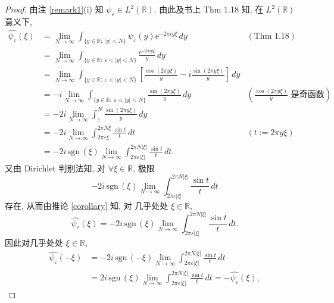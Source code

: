 \documentclass[a4paper,11pt]{article}
\theoremstyle{definition}
\def \sgn{\mathrm{\,sgn\,}}
\begin{document}
\begin{proof}
    由注 \ref{remark1}(i) 知  $ \psi_\varepsilon \in L^2(\mathbb{R}) $. 由此及书上 Thm 1.18 知, 
    在 $ L^2(\mathbb{R}) $ 意义下,
    \begin{align*}
         \widehat{\psi_\varepsilon} (\xi)
            &= \lim_{N \to \infty} \int_{\{y \in \mathbb{R} :\ |y| < N\}}  \psi_\varepsilon(y)
                \mathrm{e}^{-2 \pi i y \xi} \, dy  & (\text{Thm 1.18}) \\ 
            &= \lim_{N \to \infty} \int_{\{y \in \mathbb{R} :\ \varepsilon < |y| < N\}}  
                \frac{\mathrm{e}^{-2 \pi i y \xi}}{y} \, dy \\
            &= \lim_{N \to \infty} \int_{\{y \in \mathbb{R} :\ \varepsilon < |y| < N\}}  
                \left[ \frac{\cos(2 \pi y \xi)}{y} - i \frac{\sin(2 \pi y \xi)}{y} \right] \, dy \\
            &= - i \lim_{N \to \infty} \int_{\{y \in \mathbb{R} :\ \varepsilon < |y| < N\}} 
                \frac{\sin(2 \pi y \xi)}{y} \, dy 
                & \left( \frac{\cos(2 \pi y \xi)}{y} \text{ 是奇函数} \right)  \\
            &= - 2 i \lim_{N \to \infty} \int_\varepsilon^N \frac{\sin(2 \pi y \xi)}{y} \, dy \\
            &= - 2 i \lim_{N \to \infty} \int_{2 \pi \varepsilon \xi}^{2 \pi N \xi} \frac{\sin t}{t} \, dt
                & (t := 2 \pi y \xi) \\
            &= - 2 i \sgn (\xi) \lim_{N \to \infty} 
                \int_{2 \pi \varepsilon |\xi|}^{2 \pi N |\xi|} \frac{\sin t}{t} \, dt.
    \end{align*}
    又由 Dirichlet 判别法知, 对 $ \forall \xi \in \mathbb{R} $, 极限
    $$
        - 2 i \sgn (\xi) \lim_{N \to \infty} \int_{2 \pi \varepsilon |\xi|}^{2 \pi N |\xi|} \frac{\sin t}{t} \, dt
    $$
    存在, 从而由推论 \ref{corollary} 知, 对 几乎处处 $ \xi \in \mathbb{R} $, 
    $$
        \widehat{\psi_\varepsilon} (\xi)
            = - 2 i \sgn (\xi) \lim_{N \to \infty} \int_{2 \pi \varepsilon |\xi|}^{2 \pi N |\xi|} \frac{\sin t}{t} \, dt.
    $$
    因此对几乎处处 $ \xi \in \mathbb{R} $, 
    \begin{align*}
        \widehat{\psi_\varepsilon} (-\xi)
            &= - 2 i \sgn (-\xi) \lim_{N \to \infty} \int_{2 \pi \varepsilon |\xi|}^{2 \pi N |\xi|} \frac{\sin t}{t} \, dt \\
            &= 2 i \sgn (\xi) \lim_{N \to \infty} \int_{2 \pi \varepsilon |\xi|}^{2 \pi N |\xi|} \frac{\sin t}{t} \, dt
            = - \widehat{\psi_\varepsilon} (\xi),

\end{align*}
\end{proof}
\end{document}

